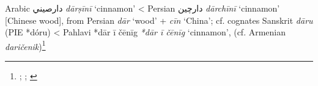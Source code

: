 \begin{etymology}\label{ety:darsini}
Arabic {دارصيني} \textit{dārṣīnī} `cinnamon'
< Persian {دارچین} \textit{dārchīnī} `cinnamon' [Chinese wood], from Persian \textit{dār} `wood' + \textit{cīn} `China'; cf. cognates Sanskrit \textit{dāru} (PIE *dóru)
< Pahlavi {*dār ī čēnīg} \textit{*dār ī čēnīg} `cinnamon', (cf. Armenian \textit{daričenik})\footnote{\textcite[311]{wehr_dictionary_1976}; \textcite{dietrich_dar_1960}; \textcite{alam_darcini_2011}}
\end{etymology}